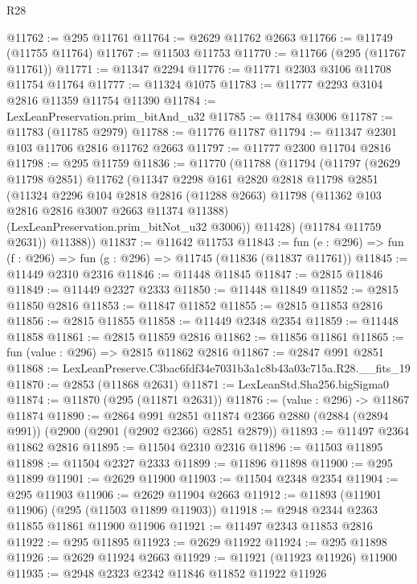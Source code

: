 \begin{lexlean}{R28}
\begin{coremodule}
@11762 := @295 @11761
@11764 := @2629 @11762 @2663
@11766 := @11749 (@11755 @11764)
@11767 := @11503 @11753
@11770 := @11766 (@295 (@11767 @11761))
@11771 := @11347 @2294
@11776 := @11771 @2303 @3106 @11708 @11754 @11764
@11777 := @11324 @1075
@11783 := @11777 @2293 @3104 @2816 @11359 @11754 @11390
@11784 := LexLeanPreservation.prim_bitAnd_u32
@11785 := @11784 @3006
@11787 := @11783 (@11785 @2979)
@11788 := @11776 @11787
@11794 := @11347 @2301 @103 @11706 @2816 @11762 @2663
@11797 := @11777 @2300 @11704 @2816
@11798 := @295 @11759
@11836 := @11770
    (@11788
      (@11794
        (@11797
          (@2629 @11798 @2851)
          @11762
          (@11347
            @2298
            @161
            @2820
            @2818
            @11798
            @2851
            (@11324
              @2296
              @104
              @2818
              @2816
              (@11288 @2663)
              @11798
              (@11362 @103 @2816 @2816 @3007 @2663 @11374 @11388)
              (LexLeanPreservation.prim_bitNot_u32 @3006))
            @11428)
          (@11784 @11759 @2631))
        @11388))
@11837 := @11642 @11753
@11843 := fun (e : @296) => fun (f : @296) => fun (g : @296) => @11745 (@11836 (@11837 @11761))
@11845 := @11449 @2310 @2316
@11846 := @11448 @11845
@11847 := @2815 @11846
@11849 := @11449 @2327 @2333
@11850 := @11448 @11849
@11852 := @2815 @11850 @2816
@11853 := @11847 @11852
@11855 := @2815 @11853 @2816
@11856 := @2815 @11855
@11858 := @11449 @2348 @2354
@11859 := @11448 @11858
@11861 := @2815 @11859 @2816
@11862 := @11856 @11861
@11865 := fun (value : @296) => @2815 @11862 @2816
@11867 := @2847 @991 @2851
@11868 := LexLeanPreserve.C3bac6fdf34e7031b3a1c8b43a03c715a.R28.__fits_19
@11870 := @2853 (@11868 @2631)
@11871 := LexLeanStd.Sha256.bigSigma0
@11874 := @11870 (@295 (@11871 @2631))
@11876 := (value : @296) -> @11867 @11874
@11890 := @2864
    @991
    @2851
    @11874
    @2366
    @2880
    (@2884 (@2894 @991))
    (@2900 (@2901 (@2902 @2366) @2851 @2879))
@11893 := @11497 @2364 @11862 @2816
@11895 := @11504 @2310 @2316
@11896 := @11503 @11895
@11898 := @11504 @2327 @2333
@11899 := @11896 @11898
@11900 := @295 @11899
@11901 := @2629 @11900
@11903 := @11504 @2348 @2354
@11904 := @295 @11903
@11906 := @2629 @11904 @2663
@11912 := @11893 (@11901 @11906) (@295 (@11503 @11899 @11903))
@11918 := @2948 @2344 @2363 @11855 @11861 @11900 @11906
@11921 := @11497 @2343 @11853 @2816
@11922 := @295 @11895
@11923 := @2629 @11922
@11924 := @295 @11898
@11926 := @2629 @11924 @2663
@11929 := @11921 (@11923 @11926) @11900
@11935 := @2948 @2323 @2342 @11846 @11852 @11922 @11926

\end{coremodule}
\end{lexlean}
